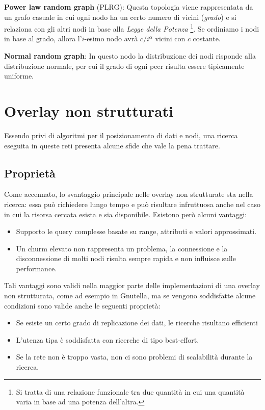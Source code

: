 \textbf{Power law random graph} (PLRG): Questa topologia viene rappresentata da un grafo casuale in cui ogni nodo ha un certo numero di vicini (\emph{grado}) e si relaziona con gli altri nodi in base alla
\emph{Legge della Potenza} \footnote{Si tratta di una relazione   funzionale tra due quantità in cui una quantità varia in base ad una   potenza dell'altra.}. Se ordiniamo i nodi in base al grado, allora l'$i$-esimo nodo avrà $c/i^\alpha$ vicini con $c$ costante.

\textbf{Normal random graph}: In questo nodo la distribuzione dei nodi risponde alla distribuzione normale, per cui il grado di ogni peer risulta essere tipicamente uniforme.

\section{Overlay non strutturati}\label{overlay-non-strutturati}

Essendo privi di algoritmi per il posizionamento di dati e nodi, una ricerca eseguita in queste reti presenta alcune sfide che vale la pena trattare.

\subsection{Proprietà}\label{proprietuxe0}

Come accennato, lo svantaggio principale nelle overlay non strutturate sta nella ricerca: essa può richiedere lungo tempo e può risultare infruttuosa anche nel caso in cui la risorsa cercata esista e sia disponibile. Esistono però alcuni vantaggi:

\begin{itemize}
\itemsep1pt\parskip0pt
\item
  Supporto le query complesse basate su range, attributi e valori   approssimati.
\item
  Un churm elevato non rappresenta un problema, la connessione e la   disconnessione di molti nodi risulta sempre rapida e non influisce   sulle performance.
\end{itemize}

Tali vantaggi sono validi nella maggior parte delle implementazioni di una overlay non strutturata, come ad esempio in Gnutella, ma se vengono soddisfatte alcune condizioni sono valide anche le seguenti proprietà: 
\begin{itemize}
\itemsep1pt\parskip0pt
\item
  Se esiste un certo grado di replicazione dei dati, le ricerche   risultano efficienti
\item
  L'utenza tipa è soddisfatta con ricerche di tipo best-effort.
\item
  Se la rete non è troppo vasta, non ci sono problemi di scalabilità   durante la ricerca.
\end{itemize}

